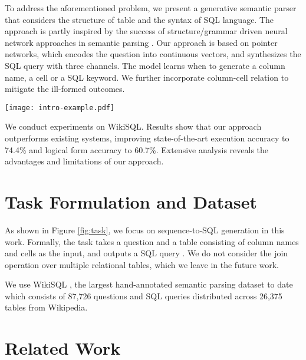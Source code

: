 \documentclass[11pt,a4paper]{article}
\begin{document}
To address the aforementioned problem, we present a generative semantic parser that considers the structure of table and the syntax of SQL language.
The approach is partly inspired by the success of structure/grammar driven neural network approaches in semantic parsing \cite{xiao-dymetman-gardent:2016:P16-1,krishnamurthy-dasigi-gardner:2017:EMNLP2017}.
Our approach is based on pointer networks, which encodes the question into continuous vectors, and synthesizes the SQL query
with three channels. The model learns when to generate a column name, a cell or a SQL keyword.
We further incorporate column-cell relation 
to mitigate the ill-formed outcomes.


\begin{figure*}[t]
	\centering
	\texttt{[image: intro-example.pdf]}	\caption{An brief illustration of the task. The focus of this work is sequence-to-SQL generation.}
	\label{fig:task}
\end{figure*}
We conduct experiments on WikiSQL.
Results show that our approach outperforms existing systems,
improving state-of-the-art execution accuracy to 74.4\%
and logical form accuracy to 60.7\%.
Extensive analysis reveals the advantages and limitations of our approach.











\section{Task Formulation and Dataset}
As shown in Figure \ref{fig:task}, we 
focus on sequence-to-SQL generation in this work. 
Formally, the task takes a question  and a table  consisting of  column names and  cells as the input, and outputs a SQL query .
We do not consider the join operation over multiple relational tables, which we leave in the future work.


We use WikiSQL \cite{zhong2017seq2sql}, the largest hand-annotated semantic parsing dataset to date which 
consists of 87,726 questions and SQL queries distributed across 26,375 tables from Wikipedia.








\section{Related Work}
\end{document}
